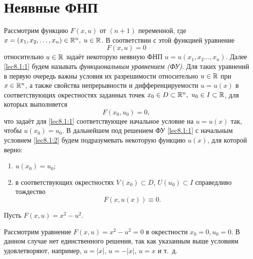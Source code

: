\documentclass[../../main.tex]{subfiles}
\begin{document}
	\section{Неявные ФНП}

	Рассмотрим функцию $F(x, u)$ от $(n+1)$ переменной, где $x = (x_1, x_2, 
	\ldots,  x_n) \in \mathbb{R}^n, \; u \in \mathbb{R}$. В соответствии с этой функцией уравнение
	 \begin{equation}
		F(x,u) = 0 \label{lec8.1:1}
	 \end{equation}
	 относительно $u \in \mathbb{R}$ задаёт некоторую неявную ФНП $u = u(x_1, x_2 
	 \ldots, x_n)$. Далее \eqref{lec8.1:1} будем называть \emph{функциональным 
	 уравнением (ФУ)}. Для таких уравнений в первую очередь важны условия их 
	 разрешимости относительно $u \in \mathbb{R}$ при $x \in \mathbb{R}^n$, а также свойства 
	 непрерывности и дифференцируемости $u = u(x)$ в соответствующих 
	 окрестностях заданных точек $x_0 \in D \subset \mathbb{R}^n,\ u_0 \in I  \subset 
	 \mathbb{R}$, 
	 для которых выполняется
	 \begin{equation}
		F(x_0, u_0) = 0, \label{lec8.1:2}
	 \end{equation}
	 что задаёт для \eqref{lec8.1:1} соответствующее начальное условие на $u = 
	 u(x)$ так, чтобы $u(x_0) = u_0$. В дальнейшем под решением ФУ 
	 \eqref{lec8.1:1} с начальным условием \eqref{lec8.1:2} будем подразумевать 
	 некоторую функцию $u(x)$, для которой верно: 
	 \begin{enumerate}
	 	\item $u(x_0) = u_0$;
	 	\item в соответствующих окрестностях $V(x_0) \subset D$, $U(u_0) 
	 	\subset I$ справедливо тождество
		\begin{equation}
			F(x, u(x)) \equiv 0. \label{lec8.1:3}
		\end{equation}
	 \end{enumerate}
	 \begin{exmp}
		Пусть $F(x, u) = x^2 - u^2$.

		Рассмотрим уравнение $F(x, u) = x^2 - u^2 = 0$ в окрестности $x_0=0, 
		u_0=0$. В данном случае нет единственного решения, так как указанным 
		выше условиям удовлетворяют, например, $u=|x|$, $u=-|x|$, $u = x$  и т.~д.
	 \end{exmp}
\end{document}
